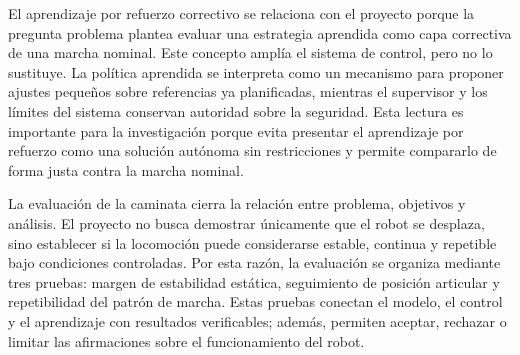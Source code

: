 El aprendizaje por refuerzo correctivo se relaciona con el proyecto porque la
pregunta problema plantea evaluar una estrategia aprendida como capa correctiva
de una marcha nominal. Este concepto amplía el sistema de control, pero no lo
sustituye. La política aprendida se interpreta como un mecanismo para proponer
ajustes pequeños sobre referencias ya planificadas, mientras el supervisor y los
límites del sistema conservan autoridad sobre la seguridad. Esta lectura es
importante para la investigación porque evita presentar el aprendizaje por
refuerzo como una solución autónoma sin restricciones y permite compararlo de
forma justa contra la marcha nominal.

La evaluación de la caminata cierra la relación entre problema, objetivos y
análisis. El proyecto no busca demostrar únicamente que el robot se desplaza,
sino establecer si la locomoción puede considerarse estable, continua y
repetible bajo condiciones controladas. Por esta razón, la evaluación se
organiza mediante tres pruebas: margen de estabilidad estática, seguimiento de
posición articular y repetibilidad del patrón de marcha. Estas pruebas conectan
el modelo, el control y el aprendizaje con resultados verificables; además,
permiten aceptar, rechazar o limitar las afirmaciones sobre el funcionamiento
del robot.

